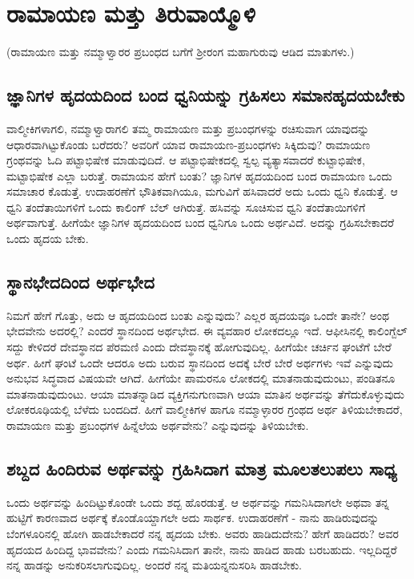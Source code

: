 \chapter{ರಾಮಾಯಣ ಮತ್ತು ತಿರುವಾಯ್ಮೊಳಿ}

(ರಾಮಾಯಣ ಮತ್ತು ನಮ್ಮಾಳ್ವಾರರ ಪ್ರಬಂಧದ ಬಗೆಗೆ ಶ್ರೀರಂಗ ಮಹಾಗುರುವು ಆಡಿದ ಮಾತುಗಳು.)

\section*{ಜ್ಞಾನಿಗಳ ಹೃದಯದಿಂದ ಬಂದ ಧ್ವನಿಯನ್ನು ಗ್ರಹಿಸಲು ಸಮಾನಹೃದಯಬೇಕು}

ವಾಲ್ಮೀಕಿಗಳಾಗಲಿ, ನಮ್ಮಾಳ್ವಾರಾಗಲಿ ತಮ್ಮ ರಾಮಾಯಣ ಮತ್ತು ಪ್ರಬಂಧಗಳನ್ನು ರಚಿಸುವಾಗ ಯಾವುದನ್ನು ಆಧಾರವಾಗಿಟ್ಟುಕೊಂಡು ಬರೆದರು? ಅವರಿಗೆ ಯಾವ ರಾಮಾಯಣ-ಪ್ರಬಂಧಗಳು ಸಿಕ್ಕಿದುವು? ರಾಮಾಯಣ ಗ್ರಂಥವನ್ನು ಓದಿ ಪಟ್ಟಾಭಿಷೇಕ ಮಾಡುವುದಿದೆ. ಆ ಪಟ್ಟಾಭಿಷೇಕದಲ್ಲಿ ಸ್ವಲ್ಪ ವ್ಯತ್ಯಾಸವಾದರೆ ಕುಟ್ಟಾಭಿಷೇಕ, ಮಟ್ಟಾಭಿಷೇಕ ಎಲ್ಲಾ ಬರುತ್ತೆ. ರಾಮಾಯನ ಹೇಗೆ ಬಂತು? ಜ್ಞಾನಿಗಳ ಹೃದಯದಿಂದ ಬಂದ ರಾಮಾಯಣ ಒಂದು ಸಮಾಚಾರ ಕೊಡುತ್ತೆ. ಉದಾಹರಣೆಗೆ ಭೌತಿಕವಾಗಿಯೂ, ಮಗುವಿಗೆ ಹಸಿವಾದರೆ ಅದು ಒಂದು ಧ್ವನಿ ಕೊಡುತ್ತೆ. ಆ ಧ್ವನಿ ತಂದೆತಾಯಿಗಳಿಗೆ ಒಂದು ಕಾಲಿಂಗ್ ಬೆಲ್ ಆಗಿರುತ್ತೆ. ಹಸಿವನ್ನು ಸೂಚಿಸುವ ಧ್ವನಿ ತಂದೆತಾಯಿಗಳಿಗೆ ಅರ್ಥವಾಗುತ್ತೆ. ಹೀಗೆಯೇ ಜ್ಞಾನಿಗಳ ಹೃದಯದಿಂದ ಬಂದ ಧ್ವನಿಗೂ ಒಂದು ಅರ್ಥವಿದೆ. ಅದನ್ನು ಗ್ರಹಿಸಬೇಕಾದರೆ ಒಂದು ಹೃದಯ ಬೇಕು.

\section*{ಸ್ಥಾನಭೇದದಿಂದ ಅರ್ಥಭೇದ}

ನಿಮಗೆ ಹೇಗೆ ಗೊತ್ತು, ಅದು ಆ ಹೃದಯದಿಂದ ಬಂತು ಎನ್ನುವುದು? ಎಲ್ಲರ ಹೃದಯವೂ ಒಂದೇ ತಾನೇ? ಅಂಥ ಭೇದವೇನು ಅದರಲ್ಲಿ? ಎಂದರೆ ಸ್ಥಾನದಿಂದ ಅರ್ಥಭೇದ. ಈ ವ್ಯವಹಾರ ಲೋಕದಲ್ಲೂ ಇದೆ. ಆಫೀಸಿನಲ್ಲಿ ಕಾಲಿಂಗ್ಬೆಲ್ ಸದ್ದು ಕೇಳಿದರೆ ದೇವಸ್ಥಾನದ ಪೆರಮಣಿ ಎಂದು ದೇವಸ್ಥಾನಕ್ಕೆ ಹೋಗುವುದಿಲ್ಲ. ಹೀಗೆಯೇ ಚರ್ಚಿನ ಘಂಟೆಗೆ ಬೇರೆ ಅರ್ಥ. ಹೀಗೆ ಘಂಟೆ ಒಂದೇ ಆದರೂ ಅದು ಬರುವ ಸ್ಥಾನದಿಂದ ಅದಕ್ಕೆ ಬೇರೆ ಬೇರೆ ಅರ್ಥಗಳು ಇವೆ ಎನ್ನುವುದು ಅನುಭವ ಸಿದ್ಧವಾದ ವಿಷಯವೇ ಆಗಿದೆ. ಹೀಗೆಯೇ ಪಾಮರನೂ ಲೋಕದಲ್ಲಿ ಮಾತನಾಡುವುದುಂಟು, ಪಂಡಿತನೂ ಮಾತನಾಡುವುದುಂಟು. ಆಯಾ‌ ಮಾತನ್ನಾಡಿದ ವ್ಯಕ್ತಿಗನುಗುಣವಾಗಿ ಆಯಾ ಮಾತಿನ ಅರ್ಥವನ್ನು ತೆಗೆದುಕೊಳ್ಳುವುದು ಲೋಕರೂಢಿಯಲ್ಲಿ ಬೆಳೆದು ಬಂದದಿದೆ. ಹೀಗೆ ವಾಲ್ಮೀಕಿಗಳ ಹಾಗೂ ನಮ್ಮಾಳ್ಳಾರರ ಗ್ರಂಥದ ಅರ್ಥ ತಿಳಿಯಬೇಕಾದರೆ, ರಾಮಾಯಣ ಮತ್ತು ಪ್ರಬಂಧಗಳ ಹಿನ್ನೆಲೆಯ ಅರ್ಥವೇನು? ಎನ್ನುವುದನ್ನು ತಿಳಿಯಬೇಕು. 


\section*{ಶಬ್ದದ ಹಿಂದಿರುವ ಅರ್ಥವನ್ನು ಗ್ರಹಿಸಿದಾಗ ಮಾತ್ರ ಮೂಲತಲುಪಲು ಸಾಧ್ಯ}

ಒಂದು ಅರ್ಥವನ್ನು ಹಿಂದಿಟ್ಟುಕೊಂಡೇ ಒಂದು ಶದ್ಬ ಹೊರಡುತ್ತೆ. ಆ ಅರ್ಥವನ್ನು ಗಮನಿಸಿದಾಗಲೇ ಅಥವಾ ತನ್ನ ಹುಟ್ಟಿಗೆ ಕಾರಣವಾದ ಅರ್ಥಕ್ಕೆ  ಕೊಂಡೊಯ್ದಾಗಲೇ ಅದು ಸಾರ್ಥಕ. ಉದಾಹರಣೆಗೆ - ನಾನು ಹಾಡಿರುವುದನ್ನು ಬೆಂಗಳೂರಿನಲ್ಲಿ ಹೋಗಿ ಹಾಡಬೇಕಾದರೆ ನನ್ನ ಹೃದಯ ಬೇಕು. ಅವರು ಹಾಡಿದುದೇನು? ಹೇಗೆ ಹಾಡಿದರು? ಅವರ ಹೃದಯದ ಹಿಂದಿದ್ದ ಭಾವವೇನು? ಎಂದು ಗಮನಿಸಿದಾಗ ತಾನೇ, ನಾನು ಹಾಡಿದ ಹಾಡು ಬರಬಹುದು. ಇಲ್ಲದಿದ್ದರೆ ನನ್ನ ಹಾಡನ್ನು ಅನುಕರಿಸಲಾಗುವುದಿಲ್ಲ. ಅಂದರೆ ನನ್ನ ಮತಿಯನ್ನನುಸರಿಸಿ ಹಾಡಬೇಕು.

